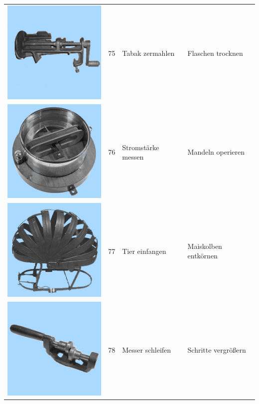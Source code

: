 \documentclass[
  english,
  doc,12pt,twoside,floatsintext]{apa7}
\begin{document}
\begin{center}
\begin{ThreePartTable}
\begin{longtable}{llll}
\includegraphics[valign=c, scale=0.19]{../materials/unfamiliar/75.png} & 75 & Tabak zermahlen & Flaschen trocknen\\
\includegraphics[valign=c, scale=0.19]{../materials/unfamiliar/76.png} & 76 & Stromstärke messen & Mandeln operieren\\
\includegraphics[valign=c, scale=0.19]{../materials/unfamiliar/77.png} & 77 & Tier einfangen & Maiskolben entkörnen\\
\includegraphics[valign=c, scale=0.19]{../materials/unfamiliar/78.png} & 78 & Messer schleifen & Schritte vergrößern\\

\end{longtable}
\end{ThreePartTable}
\end{center}
\end{document}
